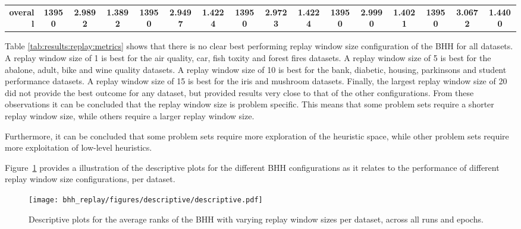 \begin{table}[H]
{\begin{tabular}{rccccccccccccccc}
			\midrule
			\textbf{overall}                    & \textbf{13950}                      & \textbf{2.9892}                                                           & \textbf{1.3892} & \textbf{13950}                 & \cellcolor[rgb]{ .776,  .937,  .808}\textcolor[rgb]{ 0,  .38,  0}{\textbf{2.9497}} & \textbf{1.4224} & \textbf{13950}                  & \textbf{2.9723}                                                           & \textbf{1.4224} & \textbf{13950}                  & \textbf{2.9990}                                                           & \textbf{1.4021} & \textbf{13950}                  & \textbf{3.0672} & \textbf{1.4400} \\
		\end{tabular}%
	}
\end{table}%

Table \ref{tab:results:replay:metrics} shows that there is no clear best performing replay window size configuration of the \acs{BHH} for all datasets. A replay window size of 1 is best for the air quality, car, fish toxity and forest fires datasets. A replay window size of 5 is best for the abalone, adult, bike and wine quality datasets. A replay window size of 10 is best for the bank, diabetic, housing, parkinsons and student performance datasets. A replay window size of 15 is best for the iris and mushroom datasets. Finally, the largest replay window size of 20 did not provide the best outcome for any dataset, but provided results very close to that of the other configurations. From these observations it can be concluded that the replay window size is problem specific. This means that some problem sets require a shorter replay window size, while others require a larger replay window size.

Furthermore, it can be concluded that some problem sets require more exploration of the heuristic space, while other problem sets require more exploitation of low-level heuristics.

Figure~\ref{fig:results:replay:descriptive:descriptive} provides a illustration of the descriptive plots for the different \acs{BHH} configurations as it relates to the performance of different replay window size configurations, per dataset.

\begin{figure}[H]
	\centering
	\texttt{[image: bhh\_replay/figures/descriptive/descriptive.pdf]}
	\caption{Descriptive plots for the average ranks of the \acs{BHH} with varying replay window sizes per dataset, across all runs and epochs.}
	\label{fig:results:replay:descriptive:descriptive}
\end{figure}

